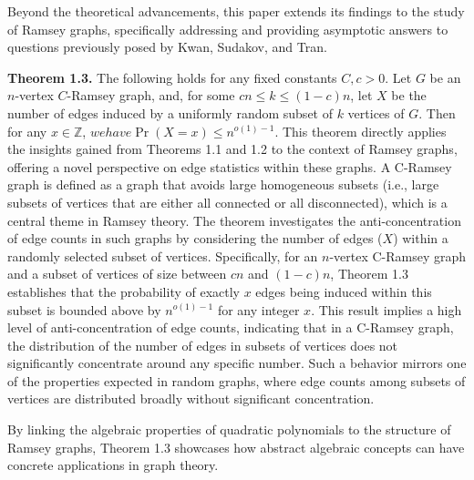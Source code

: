 Beyond the theoretical advancements, this paper extends
its findings to the study of Ramsey graphs,
specifically addressing and providing asymptotic 
answers to questions previously posed by Kwan, Sudakov, and Tran.\\\newline

\textbf{Theorem 1.3.} The following holds for any fixed constants
$C, c > 0$. Let $G$ be an $n$-vertex $C$-Ramsey graph, and, 
for some $cn \leq k \leq (1 - c)n$, let $X$ be the number of edges
induced by a uniformly random subset of $k$ vertices of $G$.
Then for any $x \in \mathbb{Z}$, $we have \Pr(X = x) \leq n^{o(1)-1}$.
This theorem directly applies the insights gained from 
Theorems 1.1 and 1.2 to the context of Ramsey graphs, 
offering a novel perspective on edge statistics within these graphs.
A C-Ramsey graph is defined as a graph that avoids large homogeneous
subsets (i.e., large subsets of vertices that are either all
connected or all disconnected), which is a central theme
in Ramsey theory. The theorem investigates the anti-concentration of edge counts in such graphs by considering the number of edges ($X$) within a randomly selected subset of vertices.
Specifically, for an $n$-vertex C-Ramsey graph and a subset
of vertices of size between $cn$ and $(1-c)n$,
Theorem 1.3 establishes that the probability of exactly $x$ edges
being induced within this subset is bounded above by $n^{o(1)-1}$
for any integer $x$. This result implies a high level of 
anti-concentration of edge counts, indicating that in a C-Ramsey graph,
the distribution of the number of edges in subsets of vertices
does not significantly concentrate around any specific number.
Such a behavior mirrors one of the properties expected in random
graphs, where edge counts among subsets of vertices are distributed
broadly without significant concentration.

By linking the algebraic properties of quadratic polynomials
to the structure of Ramsey graphs, Theorem 1.3 showcases how 
abstract algebraic concepts can have concrete applications in graph theory.
\\\newline


